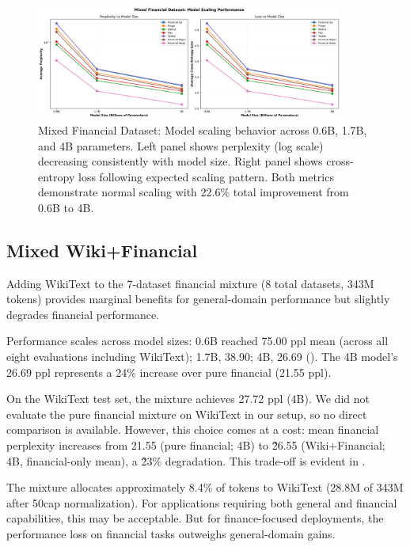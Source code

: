 \begin{figure}[htbp]
\centering
\includegraphics[width=0.9\textwidth]{figures/scaling_mixed_financial.png}
\caption[Mixed Financial Dataset: Scaling Behavior]{Mixed Financial Dataset: Model scaling behavior across 0.6B, 1.7B, and 4B parameters. Left panel shows perplexity (log scale) decreasing consistently with model size. Right panel shows cross-entropy loss following expected scaling pattern. Both metrics demonstrate normal scaling with 22.6\% total improvement from 0.6B to 4B.}
\label{fig:scaling_mixed_financial}
\end{figure}



\subsection{Mixed Wiki+Financial}

Adding WikiText to the 7-dataset financial mixture (8 total datasets, 343M tokens) provides marginal benefits for general-domain performance but slightly degrades financial performance.

Performance scales across model sizes: 0.6B reached 75.00 ppl mean (across all eight evaluations including WikiText); 1.7B, 38.90; 4B, 26.69 (). The 4B model's 26.69 ppl represents a 24\% increase over pure financial (21.55 ppl).

On the WikiText test set, the mixture achieves 27.72 ppl (4B). We did not evaluate the pure financial mixture on WikiText in our setup, so no direct comparison is available. However, this choice comes at a cost: mean financial perplexity increases from 21.55 (pure financial; 4B) to \~26.55 (Wiki+Financial; 4B, financial-only mean), a \~23\% degradation. This trade-off is evident in .

The mixture allocates approximately 8.4\% of tokens to WikiText (28.8M of 343M after 50cap normalization). For applications requiring both general and financial capabilities, this may be acceptable. But for finance-focused deployments, the performance loss on financial tasks outweighs general-domain gains.


